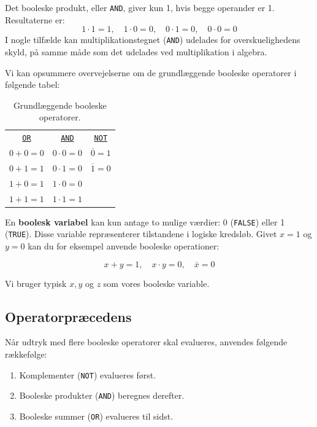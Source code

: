 Det booleske produkt, eller \texttt{AND}, giver kun 1, hvis begge operander er 1. Resultaterne er:
\[
1 \cdot 1 = 1, \quad 1 \cdot 0 = 0, \quad 0 \cdot 1 = 0, \quad 0 \cdot 0 = 0
\]
I nogle tilfælde kan multiplikationstegnet (\texttt{AND}) udelades for overskuelighedens skyld, på samme måde som det udelades ved multiplikation i algebra.

Vi kan opsummere overvejelserne om de grundlæggende booleske operatorer i følgende tabel:

\begin{table}[h!]
    \begin{center}
    \begin{tabular}{ccc}
    \underline{\texttt{OR}} & \underline{\texttt{AND}} & \underline{\texttt{NOT}} \\
    $0 + 0 = 0$ & $0 \cdot 0 = 0$ & $\overline{0} = 1$ \\
    $0 + 1 = 1$ & $0 \cdot 1 = 0$ & $\overline{1} = 0$ \\
    $1 + 0 = 1$ & $1 \cdot 0 = 0$ & \\
    $1 + 1 = 1$ & $1 \cdot 1 = 1$ & \\
    \end{tabular}
    \end{center}
    \caption{Grundlæggende booleske operatorer.}
    \label{tab:basicops}
\end{table}


\begin{remark} En \textbf{boolesk variabel} kan kun antage to mulige værdier: 0 (\texttt{FALSE}) eller 1 (\texttt{TRUE}). Disse variable repræsenterer tilstandene i logiske kredsløb. Givet $x = 1$ og $y = 0$ kan du for eksempel anvende booleske operationer:

\[
x + y = 1, \quad x \cdot y = 0, \quad \overline{x} = 0
\]

Vi bruger typisk $x, y$ og $z$ som vores booleske variable.

\end{remark}

\subsection*{Operatorpræcedens}
Når udtryk med flere booleske operatorer skal evalueres, anvendes følgende rækkefølge:
\begin{enumerate}
    \item Komplementer (\texttt{NOT}) evalueres først.
    \item Booleske produkter (\texttt{AND}) beregnes derefter.
    \item Booleske summer (\texttt{OR}) evalueres til sidst.
\end{enumerate}

